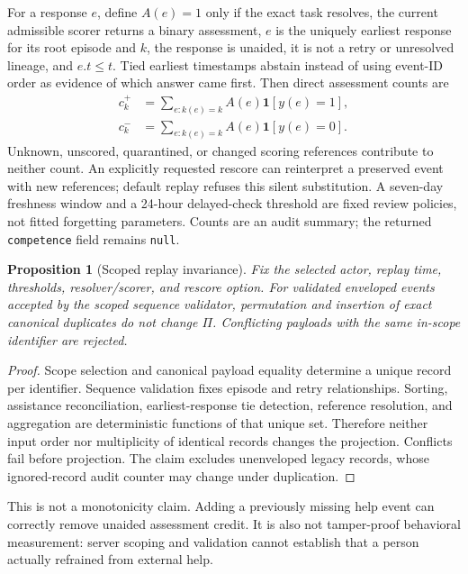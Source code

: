 \documentclass{article}
\newtheorem{proposition}{Proposition}
\newcommand{\ind}{\mathbf{1}}
\newcommand{\artifact}[1]{\nolinkurl{#1}}
\begin{document}
For a response $e$, define $A(e)=1$ only if the exact task resolves, the current admissible scorer returns a binary assessment, $e$ is the uniquely earliest response for its root episode and $k$, the response is unaided, it is not a retry or unresolved lineage, and $e.t\leq t$. Tied earliest timestamps abstain instead of using event-ID order as evidence of which answer came first. Then direct assessment counts are
\begin{align}
 c_k^+ &= \sum_{e:k(e)=k} A(e)\ind[y(e)=1],\\
 c_k^- &= \sum_{e:k(e)=k} A(e)\ind[y(e)=0].
\end{align}
Unknown, unscored, quarantined, or changed scoring references contribute to neither count. An explicitly requested rescore can reinterpret a preserved event with new references; default replay refuses this silent substitution. A seven-day freshness window and a 24-hour delayed-check threshold are fixed review policies, not fitted forgetting parameters. Counts are an audit summary; the returned \artifact{competence} field remains \artifact{null}.

\begin{proposition}[Scoped replay invariance]
\label{prop:replay}
Fix the selected actor, replay time, thresholds, resolver/scorer, and rescore option. For validated enveloped events accepted by the scoped sequence validator, permutation and insertion of exact canonical duplicates do not change $\Pi$. Conflicting payloads with the same in-scope identifier are rejected.
\end{proposition}
\begin{proof}
Scope selection and canonical payload equality determine a unique record per identifier. Sequence validation fixes episode and retry relationships. Sorting, assistance reconciliation, earliest-response tie detection, reference resolution, and aggregation are deterministic functions of that unique set. Therefore neither input order nor multiplicity of identical records changes the projection. Conflicts fail before projection. The claim excludes unenveloped legacy records, whose ignored-record audit counter may change under duplication.
\end{proof}

This is not a monotonicity claim. Adding a previously missing help event can correctly remove unaided assessment credit. It is also not tamper-proof behavioral measurement: server scoping and validation cannot establish that a person actually refrained from external help.
\end{document}

